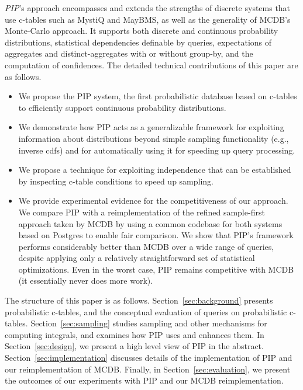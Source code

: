 {\em PIP}\/'s approach encompasses and extends the strengths of discrete systems that use c-tables such as MystiQ and MayBMS, as well as the generality of MCDB's Monte-Carlo approach.  It supports both discrete and continuous probability distributions, statistical dependencies definable by queries, expectations of aggregates and distinct-aggregates with or without  group-by,  and the computation of confidences. The detailed technical contributions of this paper are as follows.


\begin{itemize}
\item We propose the PIP system, the first probabilistic database based on c-tables to efficiently support continuous probability distributions.

\item We demonstrate how PIP acts as a generalizable framework for exploiting information about distributions beyond simple sampling functionality (e.g., inverse cdfs) and for automatically using it for speeding up query processing.  

\item We propose a technique for exploiting independence that can be established by inspecting c-table conditions to speed up sampling.

\item
We provide experimental evidence for the competitiveness of our approach.  We compare PIP with a reimplementation of the refined sample-first approach taken by MCDB by using a common codebase for both systems based on Postgres to enable fair comparison.  We show that PIP's framework performs considerably better than MCDB over a wide range of queries, despite applying only a relatively straightforward set of statistical optimizations.  Even in the worst case, PIP remains competitive with MCDB (it essentially never does more work).



\end{itemize}

The structure of this paper is as follows. Section~\ref{sec:background} presents probabilistic c-tables, and the conceptual  evaluation of queries on probabilistic c-tables. Section~\ref{sec:sampling} studies sampling and other mechanisms for computing integrals, and examines how PIP uses and enhances them.  In Section~\ref{sec:design}, we present a high level view of PIP in the abstract.   Section~\ref{sec:implementation} discusses details of the implementation of PIP and our reimplementation of MCDB.  Finally, in Section~\ref{sec:evaluation}, we present the outcomes of our experiments with PIP and our MCDB reimplementation.